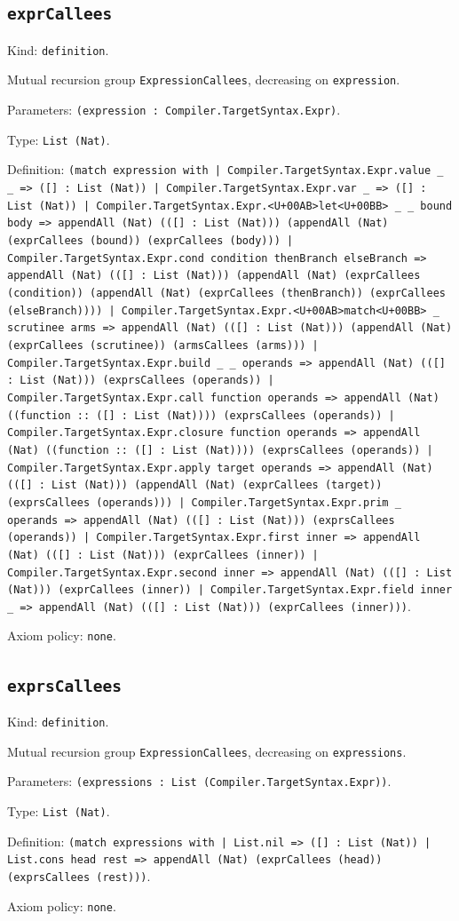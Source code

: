 \documentclass[11pt]{article}
\begin{document}
\subsection*{\texttt{exprCallees}}
\noindent Kind: \texttt{definition}.\par
\noindent Mutual recursion group \texttt{ExpressionCallees}, decreasing on \texttt{expression}.\par
\noindent Parameters: \texttt{(expression : Compiler.TargetSyntax.Expr)}.\par
\noindent Type: \texttt{List (Nat)}.\par
\noindent Definition: \texttt{(match expression with | Compiler.TargetSyntax.Expr.value \_ \_ => ([] : List (Nat)) | Compiler.TargetSyntax.Expr.var \_ => ([] : List (Nat)) | Compiler.TargetSyntax.Expr.<U+00AB>let<U+00BB> \_ \_ bound body => appendAll (Nat) (([] : List (Nat))) (appendAll (Nat) (exprCallees (bound)) (exprCallees (body))) | Compiler.TargetSyntax.Expr.cond condition thenBranch elseBranch => appendAll (Nat) (([] : List (Nat))) (appendAll (Nat) (exprCallees (condition)) (appendAll (Nat) (exprCallees (thenBranch)) (exprCallees (elseBranch)))) | Compiler.TargetSyntax.Expr.<U+00AB>match<U+00BB> \_ scrutinee arms => appendAll (Nat) (([] : List (Nat))) (appendAll (Nat) (exprCallees (scrutinee)) (armsCallees (arms))) | Compiler.TargetSyntax.Expr.build \_ \_ operands => appendAll (Nat) (([] : List (Nat))) (exprsCallees (operands)) | Compiler.TargetSyntax.Expr.call function operands => appendAll (Nat) ((function :: ([] : List (Nat)))) (exprsCallees (operands)) | Compiler.TargetSyntax.Expr.closure function operands => appendAll (Nat) ((function :: ([] : List (Nat)))) (exprsCallees (operands)) | Compiler.TargetSyntax.Expr.apply target operands => appendAll (Nat) (([] : List (Nat))) (appendAll (Nat) (exprCallees (target)) (exprsCallees (operands))) | Compiler.TargetSyntax.Expr.prim \_ operands => appendAll (Nat) (([] : List (Nat))) (exprsCallees (operands)) | Compiler.TargetSyntax.Expr.first inner => appendAll (Nat) (([] : List (Nat))) (exprCallees (inner)) | Compiler.TargetSyntax.Expr.second inner => appendAll (Nat) (([] : List (Nat))) (exprCallees (inner)) | Compiler.TargetSyntax.Expr.field inner \_ => appendAll (Nat) (([] : List (Nat))) (exprCallees (inner)))}.\par
\noindent Axiom policy: \texttt{none}.\par
\subsection*{\texttt{exprsCallees}}
\noindent Kind: \texttt{definition}.\par
\noindent Mutual recursion group \texttt{ExpressionCallees}, decreasing on \texttt{expressions}.\par
\noindent Parameters: \texttt{(expressions : List (Compiler.TargetSyntax.Expr))}.\par
\noindent Type: \texttt{List (Nat)}.\par
\noindent Definition: \texttt{(match expressions with | List.nil => ([] : List (Nat)) | List.cons head rest => appendAll (Nat) (exprCallees (head)) (exprsCallees (rest)))}.\par
\noindent Axiom policy: \texttt{none}.\par
\end{document}
